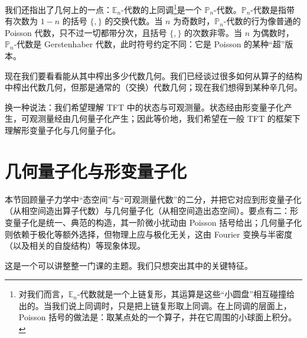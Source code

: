 我们还指出了几何上的一点：$\mathbb{E}_n$-代数的上同调\footnote{对我们而言，$\mathbb{E}_n$-代数就是一个上链复形，其运算是这些“小圆盘”相互碰撞给出的。当我们说上同调时，只是把上链复形取上同调。在上同调的层面上，Poisson 括号的做法是：取某点处的一个算子，并在它周围的小球面上积分。}是一个 $\mathbb{P}_n$-代数。$\mathbb{P}_n$-代数是指带有次数为 $1-n$ 的括号 $\{,\}$ 的交换代数。当 $n$ 为奇数时，$\mathbb{P}_n$-代数的行为像普通的 Poisson 代数，只不过一切都带分次，且括号 $\{,\}$ 的次数非零。当 $n$ 为偶数时，$\mathbb{P}_n$-代数是 Gerstenhaber 代数，此时符号约定不同：它是 Poisson 的某种“超”版本。

现在我们要看看能从其中榨出多少代数几何。我们已经谈过很多如何从算子的结构中榨出代数几何，但那是通常的（交换）代数几何；现在我们想得到某种辛几何。

换一种说法：我们希望理解 TFT 中的状态与可观测量。状态经由形变量子化产生，可观测量经由几何量子化产生；因此等价地，我们希望在一般 TFT 的框架下理解形变量子化与几何量子化。%

\section{几何量子化与形变量子化}
\begin{sectionkey}
本节回顾量子力学中“态空间”与“可观测量代数”的二分，并把它对应到形变量子化（从相空间造出算子代数）与几何量子化（从相空间造出态空间）。要点有二：形变量子化是统一、典范的构造，其一阶微小扰动由 Poisson 括号给出；几何量子化则依赖于极化等额外选择，但物理上应与极化无关，这由 Fourier 变换与半密度（以及相关的自旋结构）等现象体现。
\end{sectionkey}

这是一个可以讲整整一门课的主题。我们只想突出其中的关键特征。


